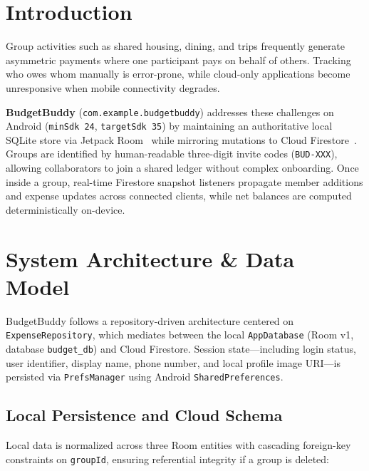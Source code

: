 \documentclass[sigconf,nonacm]{acmart}
\begin{document}
\section{Introduction}
Group activities such as shared housing, dining, and trips frequently generate asymmetric payments where one participant pays on behalf of others. Tracking who owes whom manually is error-prone, while cloud-only applications become unresponsive when mobile connectivity degrades.

\textbf{BudgetBuddy} (\texttt{com.example.budgetbuddy}) addresses these challenges on Android (\texttt{minSdk 24}, \texttt{targetSdk 35}) by maintaining an authoritative local SQLite store via Jetpack Room~\cite{room} while mirroring mutations to Cloud Firestore~\cite{firestore}. Groups are identified by human-readable three-digit invite codes (\texttt{BUD-XXX}), allowing collaborators to join a shared ledger without complex onboarding. Once inside a group, real-time Firestore snapshot listeners propagate member additions and expense updates across connected clients, while net balances are computed deterministically on-device.

\section{System Architecture \& Data Model}
BudgetBuddy follows a repository-driven architecture centered on \texttt{ExpenseRepository}, which mediates between the local \texttt{AppDatabase} (Room v1, database \texttt{budget\_db}) and Cloud Firestore. Session state—including login status, user identifier, display name, phone number, and local profile image URI—is persisted via \texttt{PrefsManager} using Android \texttt{SharedPreferences}.

\subsection{Local Persistence and Cloud Schema}
Local data is normalized across three Room entities with cascading foreign-key constraints on \texttt{groupId}, ensuring referential integrity if a group is deleted:
\end{document}
